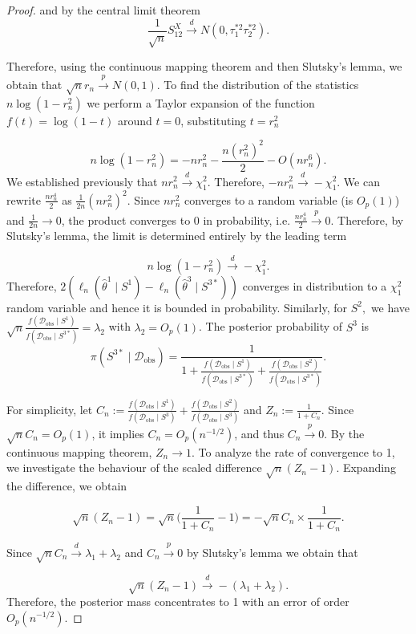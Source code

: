 \documentclass[accepted]{uai2026} %
\newcommand{\train}{\mathcal{D}}
\newcommand{\obsdata}{\train_{\text{obs}}}
\newcommand{\tsone}{\tau_1^{*2}}
\newcommand{\tstwo}{\tau_2^{*2}}
\theoremstyle{boldremark}
\begin{document}
\begin{proof}
    
    and by the central limit theorem 
    \begin{equation}
    \label{eq:derivation_chi2}
        \frac{1}{\sqrt{n}}S_{12}^X \xrightarrow{d}N(0, \tsone\tstwo).
    \end{equation}
    

    
    Therefore, using the continuous mapping theorem and then Slutsky's lemma, we obtain that $\sqrt{n}r_n \xrightarrow{p} N(0,1)$. To find the distribution of the statistics $n \log(1-r_n^2)$ we perform a Taylor expansion of the function $f(t) = \log(1-t)$ around $t=0$, substituting $t = r_n^2$
    
    $$n\log(1-r_n^2) = -nr_n^2-\frac{n(r_n^2)^2}{2} -O(nr_n^6) .$$
    We established previously that $n r_n^2 \xrightarrow{d} \chi^2_1$. Therefore, $-n r_n^2 \xrightarrow{d} -\chi^2_1$. We can rewrite $\frac{n r_n^4}{2}$ as $\frac{1}{2n} (n r_n^2)^2$. Since $n r_n^2$ converges to a random variable (is $O_p(1)$) and $\frac{1}{2n} \to 0$, the product converges to $0$ in probability, i.e. $
        \frac{n r_n^4}{2} \xrightarrow{p} 0.$ Therefore, by Slutsky's lemma, the limit is determined entirely by the leading term
        
    \begin{equation}
        \label{eq:derivation_chi3}
        n \log(1 - r_n^2) \xrightarrow{d} -\chi^2_1.
    \end{equation}   
Therefore,  $2(\ell_n(\hat{\theta}^1\mid S^1) - \ell_n(\hat{\theta}^3\mid S^{3*}))$ converges in distribution to a $\chi_1^2$ random variable and hence it is bounded in probability.
Similarly, for $S^2,$ we have $\sqrt{n} \frac{f(\obsdata\mid S^1)}{f(\obsdata\mid S^{3*})} = \lambda_2$ with $\lambda_2 = O_p(1)$. The posterior probability of $S^3$ is 
        $$\pi(S^{3*}\mid\obsdata) = \frac{1}{1+\frac{f(\obsdata\mid S^1)}{f(\obsdata\mid S^{3*})} + \frac{f(\obsdata\mid S^2)}{f(\obsdata\mid S^{3*})}}.$$

    For simplicity, let $C_n := \frac{f(\obsdata\mid S^1)}{f(\obsdata\mid S^3)} + \frac{f(\obsdata\mid S^2)}{f(\obsdata\mid S^3)}$ and $Z_n := \frac{1}{1+C_n}$. Since $\sqrt{n} C_n = O_p(1)$, it implies $C_n = O_p(n^{-1/2})$, and thus $C_n \xrightarrow{p} 0$. By the continuous mapping theorem, $Z_n \to 1$. To analyze the rate of convergence to 1, we investigate the behaviour of the scaled difference $\sqrt{n}(Z_n-1)$. Expanding the difference, we obtain

    $$\sqrt{n}(Z_n-1) = \sqrt{n}\Big(\frac{1}{1+C_n}-1\Big) = -\sqrt{n}C_n\times \frac{1}{1+C_n}.$$

    Since $\sqrt{n}C_n \xrightarrow{d} \lambda_1+\lambda_2$ and $C_n \xrightarrow{p} 0$ by Slutsky's lemma we obtain that

    $$\sqrt{n}(Z_n-1) \xrightarrow{d} -(\lambda_1+\lambda_2).$$
    Therefore, the posterior mass concentrates to 1 with an error of order $O_p(n^{-1/2})$.
\end{proof}
\end{document}
